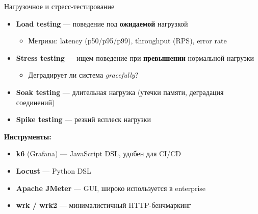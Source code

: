 \documentclass{beamer}
\begin{document}
\begin{frame}{Нагрузочное и стресс-тестирование}
\begin{itemize}
  \item \textbf{Load testing} --- поведение под \textbf{ожидаемой} нагрузкой
  \begin{itemize}
    \item Метрики: latency (p50/p95/p99), throughput (RPS), error rate
  \end{itemize}
  \item \textbf{Stress testing} --- ищем поведение при \textbf{превышении} нормальной нагрузки
  \begin{itemize}
    \item Деградирует ли система \emph{gracefully}?
  \end{itemize}
  \item \textbf{Soak testing} --- длительная нагрузка (утечки памяти, деградация соединений)
  \item \textbf{Spike testing} --- резкий всплеск нагрузки
\end{itemize}
\vspace{0.2cm}
\textbf{Инструменты:}
\begin{itemize}
  \item \textbf{k6} (Grafana) --- JavaScript DSL, удобен для CI/CD
  \item \textbf{Locust} --- Python DSL
  \item \textbf{Apache JMeter} --- GUI, широко используется в enterprise
  \item \textbf{wrk / wrk2} --- минималистичный HTTP-бенчмаркинг
\end{itemize}
\end{frame}
\end{document}
